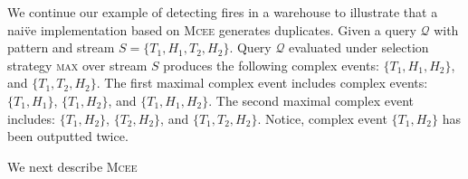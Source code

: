 \begin{example}\label{example:3}
  We continue our example of detecting fires in a warehouse to illustrate that a nai\"ve implementation based on \textsc{Mcee} generates duplicates. Given a query $\mathcal{Q}$ with pattern  and stream $S = \{ T_{1}, H_{1}, T_{2}, H_{2}\}$. Query $\mathcal{Q}$ evaluated under selection strategy \textsc{max} over stream $S$ produces the following complex events: $\{T_{1}, H_{1}, H_{2}\}$, and $\{T_{1}, T_{2}, H_{2}\}$. The first maximal complex event includes complex events: $\{T_{1}, H_{1}\}$, $\{T_{1}, H_{2}\}$, and $\{T_{1}, H_{1}, H_{2}\}$. The second maximal complex event includes: $\{T_{1}, H_{2}\}$, $\{T_{2}, H_{2}\}$, and $\{T_{1}, T_{2}, H_{2}\}$. Notice, complex event $\{T_{1}, H_{2}\}$ has been outputted twice.
\end{example}

We next describe \textsc{Mcee}























